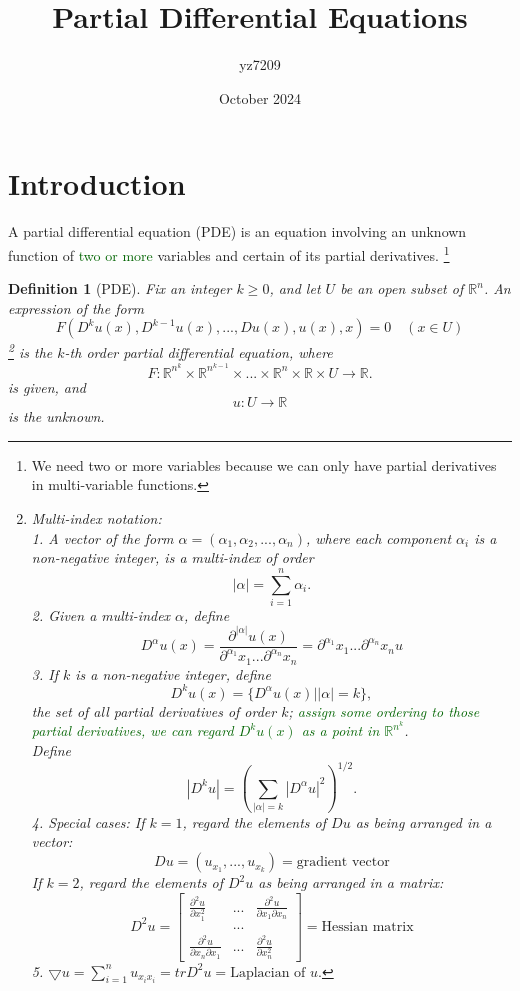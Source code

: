 \documentclass[a4paper,12pt]{report}
\title{Partial Differential Equations}
\author{yz7209}
\date{October 2024}
\newtheorem{definition}{Definition}[section]
\begin{document}
\maketitle
\tableofcontents
\newpage
\section{Introduction}
A partial differential equation (PDE) is an equation involving an unknown function of \textcolor{darkgreen}{two or more} variables and certain of its partial derivatives. \footnote{We need two or more variables because we can only have partial derivatives in multi-variable functions.}\\
\begin{definition}[PDE]
Fix an integer \(k \geq 0\), and let \(U\) be an open subset of \(\mathbb{R}^n\). An expression of the form
\[F(D^k u(x), D^{k-1} u(x), ...,  Du(x), u(x), x) = 0 \quad (x\in U)\]  \footnote{Multi-index notation: \\
1. A vector of the form \(\alpha = (\alpha_1, \alpha_2, ..., \alpha_n)\), where each component \(\alpha_i\) is a non-negative integer, is a multi-index of order 
\[|\alpha| = \sum_{i=1}^n \alpha_i.\]
2. Given a multi-index \(\alpha\), define 
\[D^{\alpha}u(x) = \frac{\partial^{|\alpha|} u(x)}{\partial^{\alpha_1} x_1 ... \partial^{\alpha_n} x_n} = \partial^{\alpha_1} x_1 ... \partial^{\alpha_n} x_n u\]
3. If \(k\) is a non-negative integer, define 
\[D^k u(x) = \{D^{\alpha}u(x)||\alpha| = k\},\] the set of all partial derivatives of order \(k\); \textcolor{darkgreen}{assign some ordering to those partial derivatives, we can regard \(D^k u(x)\) as a point in \(\mathbb{R}^{n^k}\)}. \\ 
Define
\[|D^k u| = (\sum_{|\alpha| = k} |D^{\alpha} u|^2)^{1/2}.\]
4. Special cases: If \(k = 1\), regard the elements of \(Du\) as being arranged in a vector: \[Du = (u_{x_1}, ..., u_{x_k}) = \text{gradient vector}\]
If \(k = 2\), regard the elements of \(D^2 u\) as being arranged in a matrix: \[D^2 u = 
\begin{bmatrix}
    \frac{\partial^2 u}{\partial x^2_1} & ... & \frac{\partial^2 u}{\partial x_1 \partial x_n} \\
    & ... &  \\
    \frac{\partial^2 u}{\partial x_n \partial x_1} & ... & \frac{\partial^2 u}{\partial x^2_n}
\end{bmatrix} = \text{Hessian matrix}\]
5. \(\bigtriangledown u = \sum_{i = 1}^{n} u_{x_i x_i} = trD^2 u = \text{Laplacian of }u.\)
}  is the \(k\)-th order partial differential equation, where \[F: \mathbb{R}^{n^k} \times \mathbb{R}^{n^{k-1}} \times ... \times \mathbb{R}^{n} \times \mathbb{R} \times U \to \mathbb{R}. \]
is given, and \[u: U \to \mathbb{R}\] is the unknown. 
\end{definition}
\end{document}
